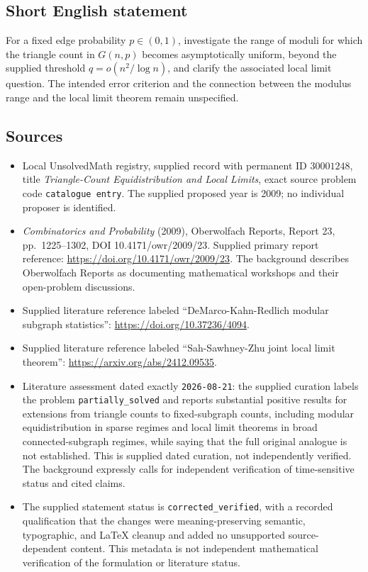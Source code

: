 \documentclass[11pt]{article}
\begin{document}
\subsection{Short English statement}
For a fixed edge probability \(p\in(0,1)\), investigate the range of moduli for which the triangle count in \(G(n,p)\) becomes asymptotically uniform, beyond the supplied threshold \(q=o(n^2/\log n)\), and clarify the associated local limit question. The intended error criterion and the connection between the modulus range and the local limit theorem remain unspecified.
\subsection{Sources}
\begin{itemize}
\item Local UnsolvedMath registry, supplied record with permanent ID \(30001248\), title \emph{Triangle-Count Equidistribution and Local Limits}, exact source problem code \texttt{catalogue entry}. The supplied proposed year is 2009; no individual proposer is identified.
\item \emph{Combinatorics and Probability} (2009), Oberwolfach Reports, Report 23, pp.~1225--1302, DOI 10.4171/owr/2009/23. Supplied primary report reference: \url{https://doi.org/10.4171/owr/2009/23}. The background describes Oberwolfach Reports as documenting mathematical workshops and their open-problem discussions.
\item Supplied literature reference labeled ``DeMarco-Kahn-Redlich modular subgraph statistics'': \url{https://doi.org/10.37236/4094}.
\item Supplied literature reference labeled ``Sah-Sawhney-Zhu joint local limit theorem'': \url{https://arxiv.org/abs/2412.09535}.
\item Literature assessment dated exactly \texttt{2026-08-21}: the supplied curation labels the problem \texttt{partially\_solved} and reports substantial positive results for extensions from triangle counts to fixed-subgraph counts, including modular equidistribution in sparse regimes and local limit theorems in broad connected-subgraph regimes, while saying that the full original analogue is not established. This is supplied dated curation, not independently verified. The background expressly calls for independent verification of time-sensitive status and cited claims.
\item The supplied statement status is \texttt{corrected\_verified}, with a recorded qualification that the changes were meaning-preserving semantic, typographic, and LaTeX cleanup and added no unsupported source-dependent content. This metadata is not independent mathematical verification of the formulation or literature status.
\end{itemize}
\end{document}

